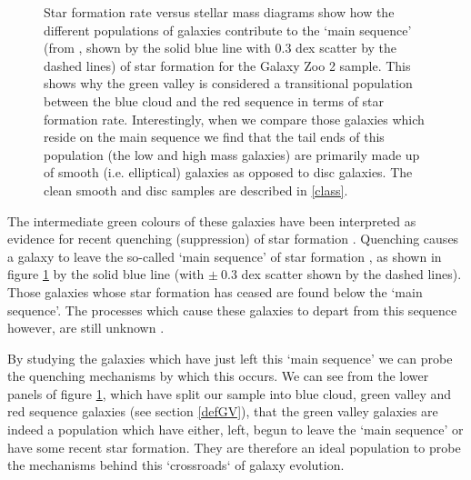 \documentclass{mn2e}
\begin{document}
\begin{figure}
\caption{Star formation rate versus stellar mass diagrams show how the different populations of galaxies contribute to the `main sequence' (from \citet{Peng}, shown by the solid blue line with 0.3 dex scatter by the dashed lines) of star formation for the Galaxy Zoo 2 sample. This shows why the green valley is considered a transitional population between the blue cloud and the red sequence in terms of star formation rate. Interestingly, when we compare those galaxies which reside on the main sequence we find that the tail ends of this population (the low and high mass galaxies) are primarily made up of smooth (i.e. elliptical) galaxies as opposed to disc galaxies. The clean smooth and disc samples are described in \ref{class}.}
\label{sfr_mass_sub}
\end{figure}

The intermediate green colours of these galaxies have been interpreted as evidence for recent quenching (suppression) of star formation \citep{Salim07}. Quenching causes a galaxy to leave the so-called `main sequence' of star formation \citep{Noeske07, Peng}, as shown in figure \ref{sfr_mass_sub} by the solid blue line (with $\pm ~0.3$ dex scatter shown by the dashed lines). Those galaxies whose star formation has ceased are found below the `main sequence'. The processes which cause these galaxies to depart from this sequence however, are still unknown \citep{Salim07, Peng, Elbaz11, Lee12} .

By studying the galaxies which  have just left this `main sequence' we can probe the quenching mechanisms by which this occurs. We can see from the lower panels of figure \ref{sfr_mass_sub}, which have split our sample into blue cloud, green valley and red sequence galaxies (see section \ref{defGV}), that the green valley galaxies are indeed a population which have either, left, begun to leave the `main sequence' or have some recent star formation. They are therefore an ideal population to probe the mechanisms behind this `crossroads` of galaxy evolution.
\end{document}
